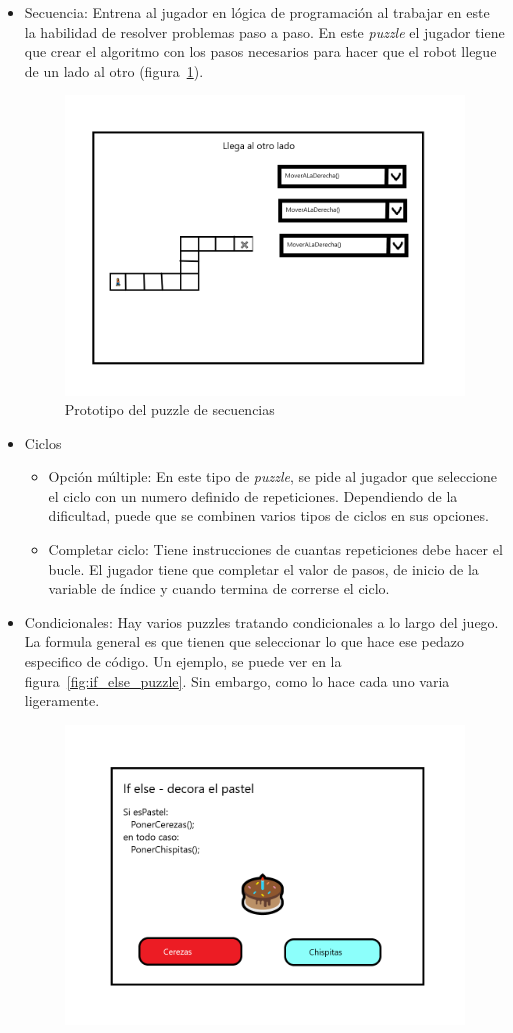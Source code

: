 \begin{itemize}
    \item Secuencia: Entrena al jugador en lógica de programación al trabajar en este la habilidad de resolver problemas paso a paso. En este \textit{puzzle} el jugador tiene que crear el algoritmo con los pasos necesarios para hacer que el robot llegue de un lado al otro (figura~\ref{fig:puzzle_secuencia}).
    \begin{figure}[H]
        \centering
        \includegraphics[width=0.5\linewidth]{images/PuzzleSecuencia.png}
        \caption{Prototipo del puzzle de secuencias}
        \label{fig:puzzle_secuencia}
    \end{figure}
    \item Ciclos
    \begin{itemize}
        \item Opción múltiple: En este tipo de \textit{puzzle}, se pide al jugador que seleccione el ciclo con un numero definido de repeticiones. Dependiendo de la dificultad, puede que se combinen varios tipos de ciclos en sus opciones. 
        \item Completar ciclo: Tiene instrucciones de cuantas repeticiones debe hacer el bucle. El jugador tiene que completar el valor de pasos, de inicio de la variable de índice y cuando termina de correrse el ciclo.
    \end{itemize}
    \item Condicionales: Hay varios puzzles tratando condicionales a lo largo del juego. La formula general es que tienen que seleccionar lo que hace ese pedazo especifico de código. Un ejemplo, se puede ver en la figura~\ref{fig:if_else_puzzle}. Sin embargo, como lo hace cada uno varia ligeramente.
    \begin{figure}[H]
                \centering
                \includegraphics[width=0.5\linewidth]{images/PuzzleIfElse.png}

\end{figure}
\end{itemize}
